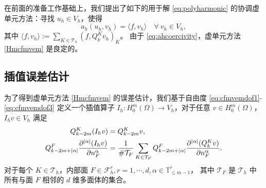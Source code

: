 在前面的准备工作基础上，我们提出了如下的用于解 \eqref{eq:polyharmonic} 
的协调虚单元方法：寻找 $u_h\in V_h$，使得
\begin{equation}\label{Hmcfmvem}
a_{h}(u_h, v_h)=\langle f, v_h\rangle\quad\forall~v_h\in V_h,
\end{equation}
其中 $\langle f, v_h\rangle:=\sum\limits_{K\in\mathcal T_h}(f, Q_k^Kv_h)_K$。
由于 \eqref{eq:ahcoercivity}，虚单元方法 \eqref{Hmcfmvem} 是良定的。

\subsection{插值误差估计}

为了得到虚单元方法 \eqref{Hmcfmvem} 的误差估计，我们基于自由度
\eqref{eq:cfmvemdof1}-\eqref{eq:cfmvemdof3} 定义一个插值算子 $I_h:
H_0^m(\Omega)\to V_h$，对于任意 $v\in
H_0^m(\Omega)$，$I_hv\in V_h$ 满足 
\begin{align*}
Q_{k-2m}^K(I_hv)&=Q_{k-2m}^Kv, \\
Q_{k-2m+|\alpha|}^F\frac{\partial^{|\alpha|}(I_hv)}{\partial
n_F^{\alpha}}&=\frac{1}{\# \mathcal T_F}\sum_{K\in\mathcal
T_F}Q_{k-2m+|\alpha|}^F\frac{\partial^{|\alpha|}(Q_k^Kv)}{\partial
n_F^{\alpha}}.
\end{align*}
对于每个 $K\in\mathcal T_h$，内部面 $F\in\mathcal F^{r}_h,  r=1,\cdots,d,
\alpha\in \mathbb{T}^r_{\leq m-1}$，
其中 $\mathcal T_F$ 是 $\mathcal T_h$ 中所有与面 $F$ 相邻的 $d$ 维多面体的集合。


